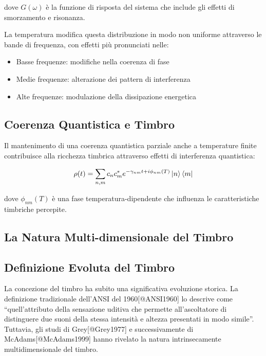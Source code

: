 \documentclass[a4paper,11pt]{article}
\providecommand{\tightlist}{%
  \setlength{\itemsep}{0pt}\setlength{\parskip}{0pt}}
\begin{document}
dove \(G(\omega)\) è la funzione di risposta del sistema che include gli
effetti di smorzamento e risonanza.

La temperatura modifica questa distribuzione in modo non uniforme
attraverso le bande di frequenza, con effetti più pronunciati nelle:

\begin{itemize}
\tightlist
\item
  Basse frequenze: modifiche nella coerenza di fase
\item
  Medie frequenze: alterazione dei pattern di interferenza
\item
  Alte frequenze: modulazione della dissipazione energetica
\end{itemize}

\subsection{Coerenza Quantistica e
Timbro}\label{coerenza-quantistica-e-timbro}

Il mantenimento di una coerenza quantistica parziale anche a temperature
finite contribuisce alla ricchezza timbrica attraverso effetti di
interferenza quantistica:

\[\rho(t) = \sum_{n,m} c_n c_m^* e^{-\gamma_{nm}t + i\phi_{nm}(T)} \ket{n}\bra{m}\]

dove \(\phi_{nm}(T)\) è una fase temperatura-dipendente che influenza le
caratteristiche timbriche percepite.

\subsection{La Natura Multi-dimensionale del
Timbro}\label{la-natura-multi-dimensionale-del-timbro-1}

\subsection{Definizione Evoluta del
Timbro}\label{definizione-evoluta-del-timbro}

La concezione del timbro ha subito una significativa evoluzione storica.
La definizione tradizionale dell'ANSI del 1960{[}@ANSI1960{]} lo
descrive come ``quell'attributo della sensazione uditiva che permette
all'ascoltatore di distinguere due suoni della stessa intensità e
altezza presentati in modo simile''. Tuttavia, gli studi di
Grey{[}@Grey1977{]} e successivamente di McAdams{[}@McAdams1999{]} hanno
rivelato la natura intrinsecamente multidimensionale del timbro.
\end{document}
